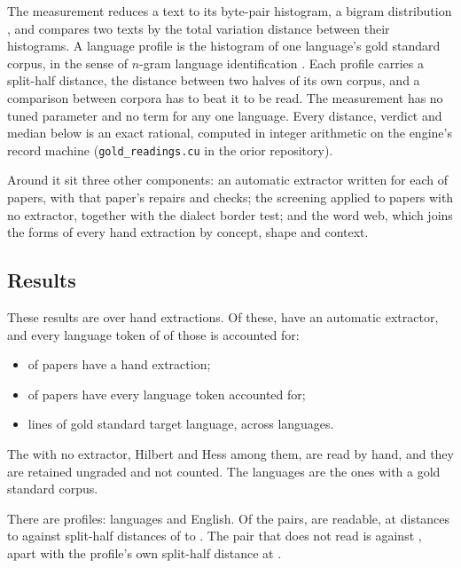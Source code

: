The measurement reduces a text to its byte-pair histogram, a bigram distribution \cite{src:Shannon-1948}, and compares two texts by the total variation distance between their histograms. A language profile is the histogram of one language's gold standard corpus, in the sense of $n$-gram language identification \cite{src:Cavnar-and-Trenkle-1994}. Each profile carries a split-half distance, the distance between two halves of its own corpus, and a comparison between corpora has to beat it to be read. The measurement has no tuned parameter and no term for any one language. Every distance, verdict and median below is an exact rational, computed in integer arithmetic on the engine's record machine (\texttt{gold\_readings.cu} in the orior repository).

Around it sit three other components: an automatic extractor written for each of \Extractors{} papers, with that paper's repairs and checks; the screening applied to papers with no extractor, together with the dialect border test; and the word web, which joins the forms of every hand extraction by concept, shape and context.

\subsection{Results}

These results are over \HandExtractions{} hand extractions. Of these, \Extractors{} have an automatic extractor, and every language token of \ExtractorsAccounted{} of those is accounted for:

\begin{itemize}
\item \HandExtractions{} of \HandExtractions{} papers have a hand extraction;
\item \ExtractorsAccounted{} of \Extractors{} papers have every language token accounted for;
\item \GoldLanguageLines{} lines of gold standard target language, across \GoldLanguages{} languages.
\end{itemize}

The \NoExtractor{} with no extractor, Hilbert and Hess \cite{src:Hilbert-and-Hess-1975} among them, are read by hand, and they are retained ungraded and not counted. The \GoldLanguages{} languages are the ones with a gold standard corpus.

There are \GoldProfiles{} profiles: \GoldLanguages{} languages and English. Of the \GoldPairs{} pairs, \GoldPairsReadMidpoint{} are readable, at distances \GoldPairLeast{} to \GoldPairMost{} against split-half distances of \GoldSplitLeast{} to \GoldSplitMost{}. The pair that does not read is \GoldUnreadLeft{} against \GoldUnreadRight{}, \GoldUnreadDistance{} apart with the \GoldUnreadWider{} profile's own split-half distance at \GoldUnreadSplit{}.

